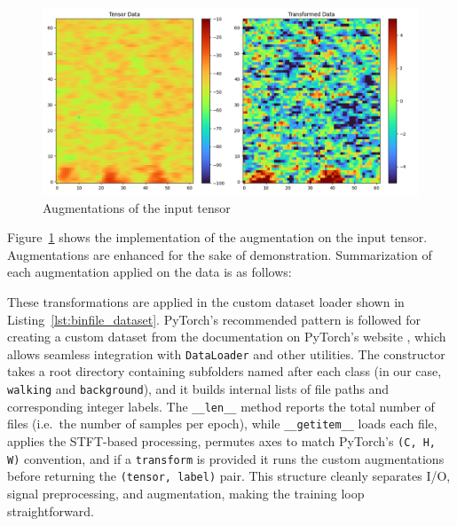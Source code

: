 \begin{figure}[h]
    \centering
    \includegraphics[width=\linewidth]{Bilder/jpg/aug.png}
    \caption{Augmentations of the input tensor}
     \label{aug}
\end{figure}

Figure~\ref{aug} shows the implementation of the augmentation on the input tensor. Augmentations are enhanced for the sake of demonstration. Summarization of each augmentation applied on the data is as follows:
  
These transformations are applied in the custom dataset loader shown in Listing~\ref{lst:binfile_dataset}. PyTorch's recommended pattern is followed for creating a custom dataset from the documentation on PyTorch's website \cite{PyTorch_website}, which allows seamless integration with \texttt{DataLoader} and other utilities. The constructor takes a root directory containing subfolders named after each class (in our case, \texttt{walking} and \texttt{background}), and it builds internal lists of file paths and corresponding integer labels. The \texttt{\_\_len\_\_} method reports the total number of files (i.e.\ the number of samples per epoch), while \texttt{\_\_getitem\_\_} loads each file, applies the STFT-based processing, permutes axes to match PyTorch's \texttt{(C, H, W)} convention, and if a \texttt{transform} is provided it runs the custom augmentations before returning the \texttt{(tensor, label)} pair. This structure cleanly separates I/O, signal preprocessing, and augmentation, making the training loop straightforward.  

